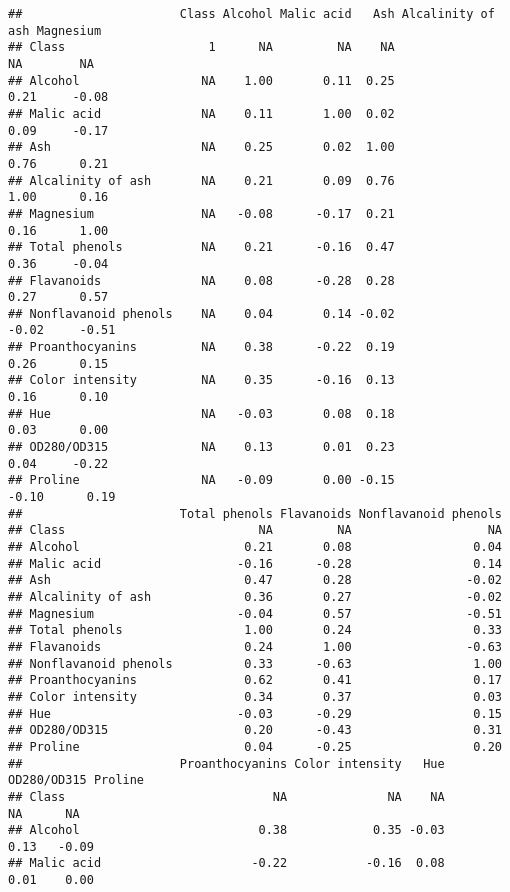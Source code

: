 \documentclass[
]{article}
\begin{document}
\begin{verbatim}
##                      Class Alcohol Malic acid   Ash Alcalinity of ash Magnesium
## Class                    1      NA         NA    NA                NA        NA
## Alcohol                 NA    1.00       0.11  0.25              0.21     -0.08
## Malic acid              NA    0.11       1.00  0.02              0.09     -0.17
## Ash                     NA    0.25       0.02  1.00              0.76      0.21
## Alcalinity of ash       NA    0.21       0.09  0.76              1.00      0.16
## Magnesium               NA   -0.08      -0.17  0.21              0.16      1.00
## Total phenols           NA    0.21      -0.16  0.47              0.36     -0.04
## Flavanoids              NA    0.08      -0.28  0.28              0.27      0.57
## Nonflavanoid phenols    NA    0.04       0.14 -0.02             -0.02     -0.51
## Proanthocyanins         NA    0.38      -0.22  0.19              0.26      0.15
## Color intensity         NA    0.35      -0.16  0.13              0.16      0.10
## Hue                     NA   -0.03       0.08  0.18              0.03      0.00
## OD280/OD315             NA    0.13       0.01  0.23              0.04     -0.22
## Proline                 NA   -0.09       0.00 -0.15             -0.10      0.19
##                      Total phenols Flavanoids Nonflavanoid phenols
## Class                           NA         NA                   NA
## Alcohol                       0.21       0.08                 0.04
## Malic acid                   -0.16      -0.28                 0.14
## Ash                           0.47       0.28                -0.02
## Alcalinity of ash             0.36       0.27                -0.02
## Magnesium                    -0.04       0.57                -0.51
## Total phenols                 1.00       0.24                 0.33
## Flavanoids                    0.24       1.00                -0.63
## Nonflavanoid phenols          0.33      -0.63                 1.00
## Proanthocyanins               0.62       0.41                 0.17
## Color intensity               0.34       0.37                 0.03
## Hue                          -0.03      -0.29                 0.15
## OD280/OD315                   0.20      -0.43                 0.31
## Proline                       0.04      -0.25                 0.20
##                      Proanthocyanins Color intensity   Hue OD280/OD315 Proline
## Class                             NA              NA    NA          NA      NA
## Alcohol                         0.38            0.35 -0.03        0.13   -0.09
## Malic acid                     -0.22           -0.16  0.08        0.01    0.00

\end{verbatim}
\end{document}
